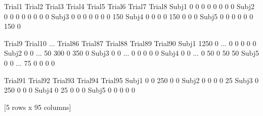 \documentclass[letterpaper,10pt,english]{jupyterBook}
\begin{document}
\begin{sphinxVerbatim}[commandchars=\\\{\}]
  
   
\end{sphinxVerbatim}

\begin{sphinxVerbatim}[commandchars=\\\{\}]
        Trial1  Trial2  Trial3  Trial4  Trial5  Trial6  Trial7  Trial8  \PYGZbs{}
Subj\PYGZus{}1       0       0       0       0       0       0       0       0   
Subj\PYGZus{}2       0       0       0       0       0       0       0       0   
Subj\PYGZus{}3       0       0       0       0       0       0       0    \PYGZhy{}150   
Subj\PYGZus{}4       0       0       0       0    \PYGZhy{}150       0       0       0   
Subj\PYGZus{}5       0       0       0       0       0       0    \PYGZhy{}150       0   

        Trial9  Trial10  ...  Trial86  Trial87  Trial88  Trial89  Trial90  \PYGZbs{}
Subj\PYGZus{}1   \PYGZhy{}1250        0  ...        0        0        0        0        0   
Subj\PYGZus{}2       0        0  ...      \PYGZhy{}50     \PYGZhy{}300        0     \PYGZhy{}350        0   
Subj\PYGZus{}3       0        0  ...        0        0        0        0        0   
Subj\PYGZus{}4       0        0  ...        0      \PYGZhy{}50        0      \PYGZhy{}50      \PYGZhy{}50   
Subj\PYGZus{}5       0        0  ...      \PYGZhy{}75        0        0        0        0   

        Trial91  Trial92  Trial93  Trial94  Trial95  
Subj\PYGZus{}1        0        0     \PYGZhy{}250        0        0  
Subj\PYGZus{}2        0        0        0        0      \PYGZhy{}25  
Subj\PYGZus{}3        0     \PYGZhy{}250        0        0        0  
Subj\PYGZus{}4        0      \PYGZhy{}25        0        0        0  
Subj\PYGZus{}5        0        0        0        0        0  

[5 rows x 95 columns]
\end{sphinxVerbatim}

\begin{sphinxVerbatim}[commandchars=\\\{\}]
   
\end{sphinxVerbatim}
\end{document}
